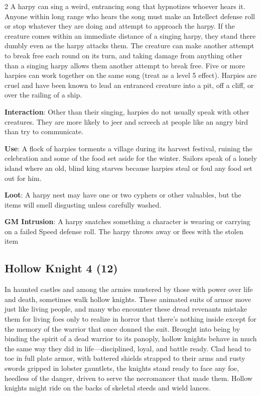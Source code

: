 \begin{multicols}{2}
A harpy can sing a weird, entrancing song that hypnotizes whoever hears it. Anyone within long range who hears the song must make an Intellect defense roll or stop whatever they are doing and attempt to approach the harpy. If the creature comes within an immediate distance of a singing harpy, they stand there dumbly even as the harpy attacks them. The creature can make another attempt to break free each round on its turn, and taking damage from anything other than a singing harpy allows them another attempt to break free. Five or more harpies can work together on the same song (treat as a level 5 effect). Harpies are cruel and have been known to lead an entranced creature into a pit, off a cliff, or over the railing of a ship. 

\textbf{Interaction}: Other than their singing, harpies do not usually speak with other creatures. They are more likely to jeer and screech at people like an angry bird than try to communicate. 

\textbf{Use}: A flock of harpies torments a village during its harvest festival, ruining the celebration and some of the food set aside for the winter. Sailors speak of a lonely island where an old, blind king starves because harpies steal or foul any food set out for him. 

\textbf{Loot}: A harpy nest may have one or two cyphers or other valuables, but the items will smell disgusting unless carefully washed.

\textbf{GM Intrusion}: A harpy snatches something a character is wearing or carrying on a failed Speed defense roll. The harpy throws away or flees with the stolen item

\subsection{Hollow Knight 4 (12)}

In haunted castles and among the armies mustered by those with power over life and death, sometimes walk hollow knights. These animated suits of armor move just like living people, and many who encounter these dread revenants mistake them for living foes only to realize in horror that there’s nothing inside except for the memory of the warrior that once donned the suit. Brought into being by binding the spirit of a dead warrior to its panoply, hollow knights behave in much the same way they did in life—disciplined, loyal, and battle ready. Clad head to toe in full plate armor, with battered shields strapped to their arms and rusty swords gripped in lobster gauntlets, the knights stand ready to face any foe, heedless of the danger, driven to serve the necromancer that made them. Hollow knights might ride on the backs of skeletal steeds and wield lances. 


\end{multicols}
